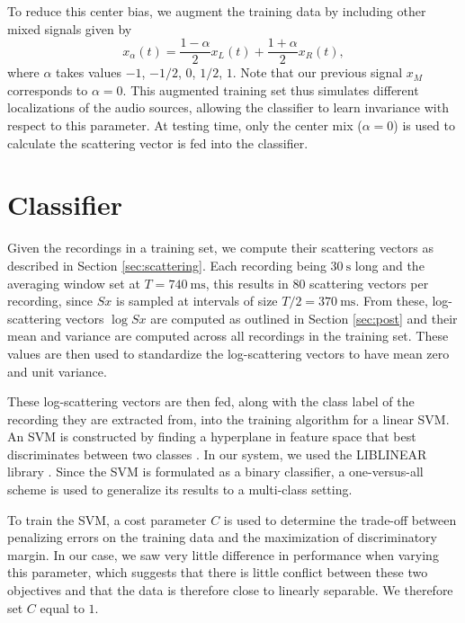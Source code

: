 \documentclass{article}
\begin{document}
\begin{sloppy}
To reduce this center bias, we augment the training data by including other mixed signals given by
\begin{equation}
	x_\alpha(t) = \frac{1-\alpha}{2} x_L(t) + \frac{1+\alpha}{2} x_R(t),
\end{equation}
where $\alpha$ takes values $-1$, $-1/2$, $0$, $1/2$, $1$. Note that our previous signal $x_M$ corresponds to $\alpha = 0$. This augmented training set thus simulates different localizations of the audio sources, allowing the classifier to learn invariance with respect to this parameter. At testing time, only the center mix ($\alpha = 0$) is used to calculate the scattering vector is fed into the classifier.

\section{Classifier}
\label{sec:classifier}

Given the recordings in a training set, we compute their scattering vectors as described in Section \ref{sec:scattering}. Each recording being $30~\mathrm{s}$ long and the averaging window set at $T = 740~\mathrm{ms}$, this results in $80$ scattering vectors per recording, since $Sx$ is sampled at intervals of size $T/2 = 370~\mathrm{ms}$. From these, log-scattering vectors $\log Sx$ are computed as outlined in Section \ref{sec:post} and their mean and variance are computed across all recordings in the training set. These values are then used to standardize the log-scattering vectors to have mean zero and unit variance.

These log-scattering vectors are then fed, along with the class label of the recording they are extracted from, into the training algorithm for a linear SVM. An SVM is constructed by finding a hyperplane in feature space that best discriminates between two classes \cite{vapnik}. In our system, we used the LIBLINEAR library \cite{liblinear}. Since the SVM is formulated as a binary classifier, a one-versus-all scheme is used to generalize its results to a multi-class setting.

To train the SVM, a cost parameter $C$ is used to determine the trade-off between penalizing errors on the training data and the maximization of discriminatory margin. In our case, we saw very little difference in performance when varying this parameter, which suggests that there is little conflict between these two objectives and that the data is therefore close to linearly separable. We therefore set $C$ equal to $1$.


\end{sloppy}
\end{document}
